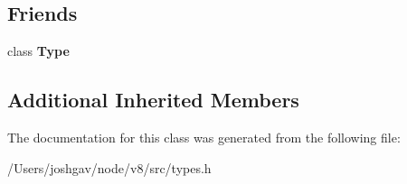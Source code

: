 \subsection*{Friends}
\begin{DoxyCompactItemize}
\item 
class {\bfseries Type}\hypertarget{classv8_1_1internal_1_1_structural_type_a18dba29b4f3e91d6d2bc53472a6bb7cc}{}\label{classv8_1_1internal_1_1_structural_type_a18dba29b4f3e91d6d2bc53472a6bb7cc}

\end{DoxyCompactItemize}
\subsection*{Additional Inherited Members}


The documentation for this class was generated from the following file\+:\begin{DoxyCompactItemize}
\item 
/\+Users/joshgav/node/v8/src/types.\+h\end{DoxyCompactItemize}
